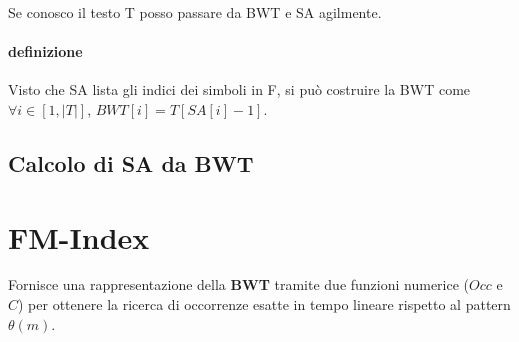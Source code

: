 Se conosco il testo T posso passare da BWT e SA agilmente.

\paragraph{definizione} Visto che SA lista gli indici dei simboli in F, si pu\`o costruire la BWT come $\forall i \in [1, |T|]$, $BWT[i] = T[SA[i] - 1]$.

\subsection{Calcolo di SA da BWT}

\section{FM-Index}

Fornisce una rappresentazione della \textbf{BWT} tramite due funzioni numerice ($Occ$ e $C$) per ottenere la ricerca di occorrenze esatte in tempo lineare rispetto al pattern $\theta(m)$.

